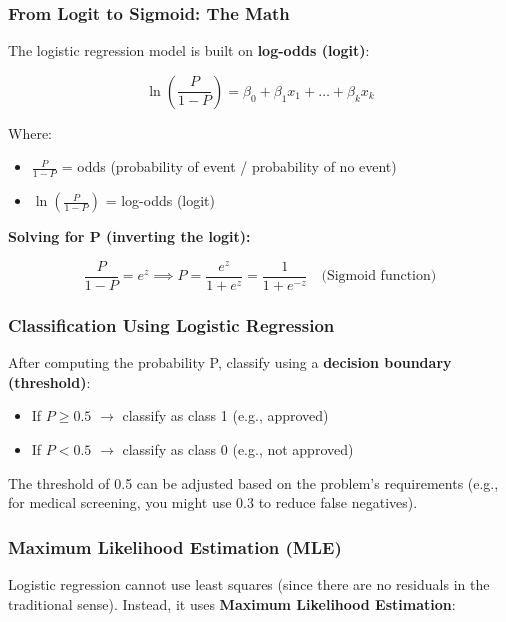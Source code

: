 \documentclass[12pt,openany]{book}
\begin{document}
\subsubsection{From Logit to Sigmoid: The Math}


The logistic regression model is built on \textbf{log-odds (logit)}:

\[
\ln\left(\frac{P}{1-P}\right) = \beta_0 + \beta_1 x_1 + \dots + \beta_k x_k
\]


Where:
\begin{itemize}[leftmargin=*]
    \item \(\frac{P}{1-P}\) = odds (probability of event / probability of no event)
    \item \(\ln\left(\frac{P}{1-P}\right)\) = log-odds (logit)

\end{itemize}

\textbf{Solving for P (inverting the logit):}

\[
\frac{P}{1-P} = e^z \implies P = \frac{e^z}{1 + e^z} = \frac{1}{1 + e^{-z}} \quad \text{(Sigmoid function)}
\]


\subsubsection{Classification Using Logistic Regression}


After computing the probability P, classify using a \textbf{decision boundary (threshold)}:

\begin{itemize}[leftmargin=*]
    \item If \(P \geq 0.5\) \(\rightarrow\) classify as class 1 (e.g., approved)
    \item If \(P < 0.5\) \(\rightarrow\) classify as class 0 (e.g., not approved)

\end{itemize}

The threshold of 0.5 can be adjusted based on the problem's requirements (e.g., for medical screening, you might use 0.3 to reduce false negatives).

\subsubsection{Maximum Likelihood Estimation (MLE)}


Logistic regression cannot use least squares (since there are no residuals in the traditional sense). Instead, it uses \textbf{Maximum Likelihood Estimation}:
\end{document}
